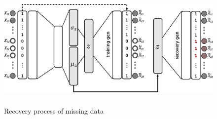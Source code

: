 \begin{figure}
    \centering
    \includegraphics[height=6cm]{img/STEP7_CLEAN/VAE_CLEAN.eps}
    \caption{Recovery process of missing data}
    \label{fig:VAE_recovery}
\end{figure}



